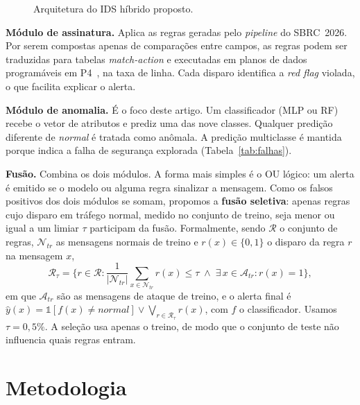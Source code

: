 \documentclass[12pt]{article}
\begin{document}
\begin{figure}[!htbp]
\centering
\resizebox{\linewidth}{!}{}
\caption{Arquitetura do IDS híbrido proposto.}
\label{fig:arq}
\end{figure}

\textbf{Módulo de assinatura.} Aplica as regras geradas pelo \textit{pipeline}
do SBRC~2026. Por serem compostas apenas de comparações entre campos, as regras
podem ser traduzidas para tabelas \textit{match-action} e executadas em planos
de dados programáveis em P4~\cite{bosshart2014p4,xavier2021programmable,fida2026pdpsurvey},
na taxa de linha. Cada disparo identifica a \textit{red flag} violada, o que facilita explicar o alerta.

\textbf{Módulo de anomalia.} É o foco deste artigo. Um classificador (MLP ou RF)
recebe o vetor de atributos e prediz uma das nove classes. Qualquer predição
diferente de \textit{normal} é tratada como anômala. A predição multiclasse é
mantida porque indica a falha de segurança explorada (Tabela~\ref{tab:falhas}).

\textbf{Fusão.} Combina os dois módulos. A forma mais simples é o OU lógico:
um alerta é emitido se o modelo ou alguma regra sinalizar a mensagem. Como os
falsos positivos dos dois módulos se somam, propomos a \textbf{fusão seletiva}:
apenas regras cujo disparo em tráfego normal, medido no conjunto de treino,
seja menor ou igual a um limiar $\tau$ participam da fusão. Formalmente, sendo
$\mathcal{R}$ o conjunto de regras, $\mathcal{N}_{tr}$ as mensagens normais de
treino e $r(x)\in\{0,1\}$ o disparo da regra $r$ na mensagem $x$,
\begin{equation}
\mathcal{R}_\tau = \Big\{ r \in \mathcal{R} : \frac{1}{|\mathcal{N}_{tr}|}\sum_{x\in\mathcal{N}_{tr}} r(x) \le \tau \;\wedge\; \exists\,x \in \mathcal{A}_{tr}: r(x)=1 \Big\},
\end{equation}
em que $\mathcal{A}_{tr}$ são as mensagens de ataque de treino, e o alerta final é
$\hat{y}(x) = \mathbb{1}[f(x)\neq\textit{normal}] \lor \bigvee_{r\in\mathcal{R}_\tau} r(x)$,
com $f$ o classificador. Usamos $\tau = 0{,}5\%$. A seleção usa apenas o
treino, de modo que o conjunto de teste não influencia quais regras entram.

\section{Metodologia}\label{sec:met}
\end{document}

